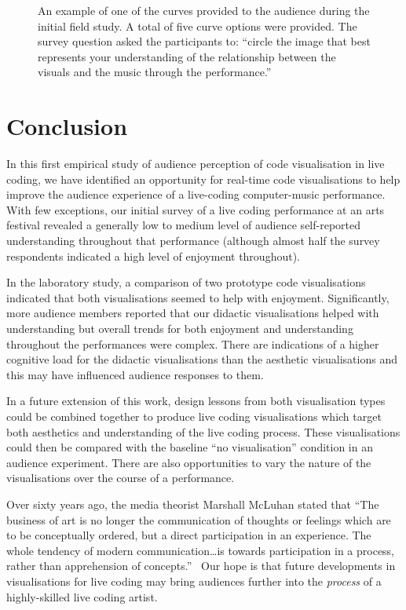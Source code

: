 \documentclass{sig-alternate}
\begin{document}
\fboxsep=6mm
\begin{figure}
\centering
{}
\caption{An example of one of the curves provided to the audience
during the initial field study. A total of five curve options were
provided. The survey question asked the participants to: ``circle the
image that best represents your understanding of the relationship
between the visuals and the music through the performance.''}
\label{fig:understanding-over-time}
\end{figure}

\section{Conclusion}

In this first empirical study of audience perception of code
visualisation in live coding, we have identified an opportunity for
real-time code visualisations to help improve the audience experience
of a live-coding computer-music performance. With few exceptions, our
initial survey of a live coding performance at an arts festival
revealed a generally low to medium level of audience self-reported
understanding throughout that performance (although almost half the
survey respondents indicated a high level of enjoyment throughout).

In the laboratory study, a comparison of two prototype code
visualisations indicated that both visualisations seemed to help with
enjoyment. Significantly, more audience members reported that our
didactic visualisations helped with understanding but overall trends
for both enjoyment and understanding throughout the performances were
complex. There are indications of a higher cognitive load for the
didactic visualisations than the aesthetic visualisations and this may
have influenced audience responses to them.

In a future extension of this work, design lessons from both
visualisation types could be combined together to produce live coding
visualisations which target both aesthetics and understanding of the
live coding process. These visualisations could then be compared with
the baseline ``no visualisation'' condition in an audience experiment.
There are also opportunities to vary the nature of the visualisations
over the course of a performance.

Over sixty years ago, the media theorist Marshall McLuhan stated that
``The business of art is no longer the communication of thoughts or
feelings which are to be conceptually ordered, but a direct
participation in an experience. The whole tendency of modern
communication\ldots is towards participation in a process, rather than
apprehension of concepts.''~\cite{McLuhan} Our hope is that future
developments in visualisations for live coding may bring audiences
further into the \emph{process} of a highly-skilled live coding
artist.
\end{document}
